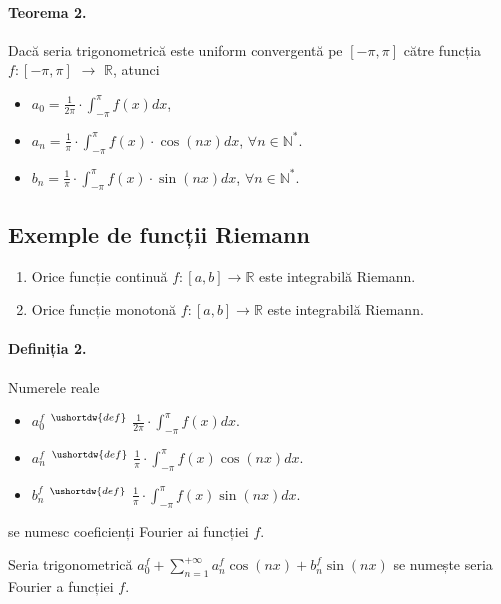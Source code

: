 \pagebreak

\paragraph{Teorema 2.}
Dacă seria trigonometrică este uniform convergentă pe $[-\pi, \pi]$ către funcția $f:[-\pi,\pi]$ $\rightarrow$ $\mathbb{R}$, atunci
\begin{itemize}
	\item $a_{0} = \frac{1}{2 \pi} \cdot \int_{-\pi}^{\pi}f(x)dx$,
	\item $a_{n} = \frac{1}{\pi} \cdot \int_{-\pi}^{\pi}f(x) \cdot \cos(nx) dx$, $\forall n \in \mathbb{N}^{*}$.
	\item $b_{n} = \frac{1}{\pi} \cdot \int_{-\pi}^{\pi}f(x) \cdot \sin(nx) dx$, $\forall n \in \mathbb{N}^{*}$.
\end{itemize}

\subsection{Exemple de funcții Riemann}
\begin{enumerate}[label=\emph{\arabic*})]
	\item Orice funcție continuă $f:[a,b] \rightarrow \mathbb{R}$ este integrabilă Riemann.
	\item Orice funcție monotonă $f:[a,b] \rightarrow \mathbb{R}$ este integrabilă Riemann.
\end{enumerate}

\paragraph{Definiția 2.}
Numerele reale
\begin{itemize}
	\item $a_{0}^{f}$ $^{\ushortdw{def}}$ $\displaystyle\frac{1}{2 \pi}
        \cdot \displaystyle\int_{-\pi}^{\pi}f(x)dx.$
	\item $a_{n}^{f}$ $^{\ushortdw{def}}$ $\displaystyle\frac{1}{\pi}
        \cdot \displaystyle\int_{-\pi}^{\pi}f(x) \cos(nx) dx.$
	\item $b_{n}^{f}$ $^{\ushortdw{def}}$ $\displaystyle\frac{1}{\pi}
        \cdot \displaystyle\int_{-\pi}^{\pi}f(x) \sin(nx) dx.$
\end{itemize}
se numesc coeficienți Fourier ai funcției $f$.

Seria trigonometrică $a_{0}^{f} + \displaystyle\sum_{n=1}^{+\infty}a_{n}^{f}\cos(nx) + b_{n}^{f}\sin(nx)$ se numește seria Fourier a funcției $f$.

